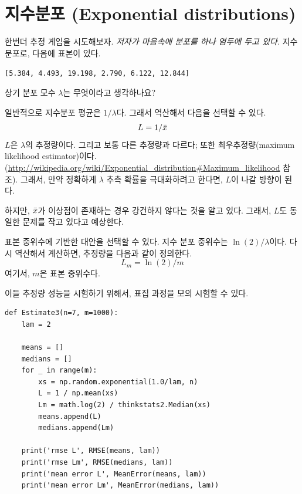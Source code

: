 \section{지수분포 (Exponential distributions)}

한번더 추정 게임을 시도해보자. 
{\em 저자가 마음속에 분포를 하나 염두에 두고 있다.}
지수분포로, 다음에 표본이 있다.

{\tt [5.384, 4.493, 19.198, 2.790, 6.122, 12.844]}

상기 분포 모수 $\lambda$는 무엇이라고 생각하나요?


\newcommand{\lamhat}{L}
\newcommand{\lamhatmed}{L_m}

일반적으로 지수분포 평균은 $1/\lambda$다. 그래서 역산해서 다음을 선택할 수 있다.
%
\[ \lamhat = 1 / \xbar\]
%
$\lamhat$은 $\lambda$의 추정량이다. 그리고 보통 다른 추정량과 다르다; 또한 최우추정량(maximum likelihood estimator)이다. (\url{http://wikipedia.org/wiki/Exponential_distribution#Maximum_likelihood} 참조).
그래서, 만약 정확하게 $\lambda$ 추측 확률을 극대화하려고 한다면, $\lamhat$이 나갈 방향이 된다.

하지만, $\bar{x}$가 이상점이 존재하는 경우 강건하지 않다는 것을 알고 있다.
그래서, $\lamhat$도 동일한 문제를 작고 있다고 예상한다.

표본 중위수에 기반한 대안을 선택할 수 있다.
지수 분포 중위수는 $\ln(2) / \lambda$이다. 
다시 역산해서 계산하면, 추정량을 다음과 같이 정의한다.
%
\[ \lamhatmed = \ln(2) / m \]
%
여기서, $m$은 표본 중위수다.

이들 추정량 성능을 시험하기 위해서, 표집 과정을 모의 시험할 수 있다.

\begin{verbatim}
def Estimate3(n=7, m=1000):
    lam = 2

    means = []
    medians = []
    for _ in range(m):
        xs = np.random.exponential(1.0/lam, n)
        L = 1 / np.mean(xs)
        Lm = math.log(2) / thinkstats2.Median(xs)
        means.append(L)
        medians.append(Lm)

    print('rmse L', RMSE(means, lam))
    print('rmse Lm', RMSE(medians, lam))
    print('mean error L', MeanError(means, lam))
    print('mean error Lm', MeanError(medians, lam))
\end{verbatim}

